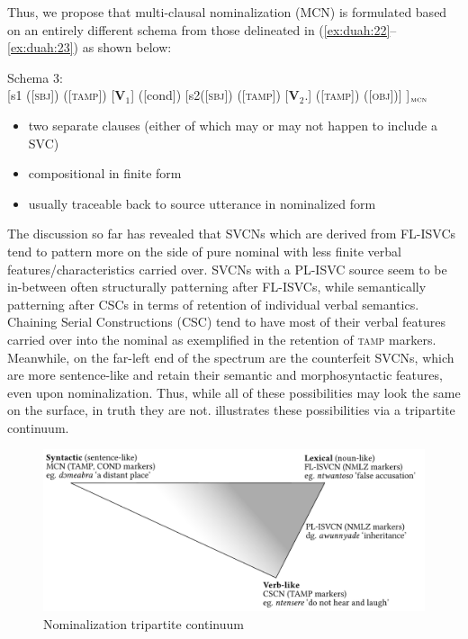 \documentclass[output=paper,modfonts,nonflat,colorlinks, citecolor=brown, hidelinks]{langsci/langscibook}
\begin{document}
Thus, we propose that multi-clausal nominalization (MCN) is formulated based on an entirely different schema from those delineated in (\ref{ex:duah:22}--\ref{ex:duah:23}) as shown below:

\ea
Schema 3:\\{}
{\small
[s1 ([\textsc{sbj}]) ([\textsc{tamp}]) [\textbf{V}$_1$] ([cond])	[s2([\textsc{sbj}]) ([\textsc{tamp}])
										[\textbf{V}$_2$.]	([\textsc{tamp}]) ([\textsc{obj}])] ]$_{\textsc{mcn}}$
}
\begin{itemize}
\item two separate clauses (either of which may or may not happen to include a SVC)
\item compositional in finite form
\item usually traceable back to source utterance in nominalized form
\end{itemize}
\z

The discussion so far has revealed that SVCNs which are derived from FL-ISVCs tend to pattern more on the side of pure nominal with less finite verbal features/characteristics carried over. SVCNs with a PL-ISVC source seem to be in-between often structurally patterning after FL-ISVCs, while semantically patterning after CSCs in terms of retention of individual verbal semantics. Chaining Serial Constructions (CSC) tend to have most of their verbal features carried over into the nominal as exemplified in the retention of \textsc{tamp} markers. Meanwhile, on the far-left end of the spectrum are the counterfeit SVCNs, which are more sentence-like and retain their semantic and morphosyntactic features, even upon nominalization. Thus, while all of these possibilities may look the same on the surface, in truth they are not.  illustrates these possibilities via a tripartite continuum.

\begin{figure}
\includegraphics[width=\textwidth]{fig-duah-2.pdf}
\caption{Nominalization tripartite continuum}
\label{fig:duah:4}
\end{figure}
\end{document}
